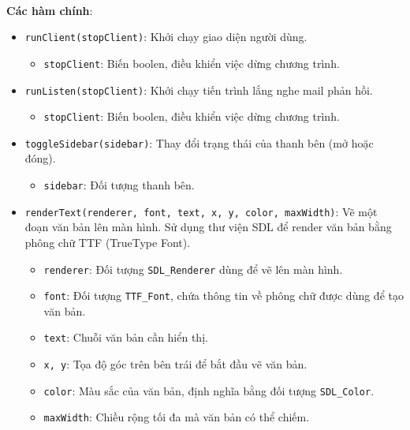 \begin{itemize}
\end{itemize}


\paragraph{}{\textbf{Các hàm chính}:}
\begin{itemize}
    \item \texttt{runClient(stopClient)}: Khởi chạy giao diện người dùng.
    \begin{itemize}
        \item \texttt{stopClient}: Biến boolen, điều khiển việc dừng chương trình.
    \end{itemize}
    \item \texttt{runListen(stopClient)}: Khởi chạy tiến trình lắng nghe mail phản hồi.
    \begin{itemize}
        \item \texttt{stopClient}: Biến boolen, điều khiển việc dừng chương trình.
    \end{itemize}

    \item \texttt{toggleSidebar(sidebar)}: Thay đổi trạng thái của thanh bên (mở hoặc đóng).
    \begin{itemize}
        \item \texttt{sidebar}: Đối tượng thanh bên.
    \end{itemize}
    
    \item \texttt{renderText(renderer, font, text, x, y, color, maxWidth)}: Vẽ một đoạn văn bản lên màn hình. Sử dụng thư viện SDL để render văn bản bằng phông chữ TTF (TrueType Font).
    \begin{itemize}
        \item \texttt{renderer}: Đối tượng \texttt{SDL\_Renderer} dùng để vẽ lên màn hình.
        \item \texttt{font}: Đối tượng \texttt{TTF\_Font}, chứa thông tin về phông chữ được dùng để tạo văn bản.
        \item \texttt{text}: Chuỗi văn bản cần hiển thị.
        \item \texttt{x, y}: Tọa độ góc trên bên trái để bắt đầu vẽ văn bản.
        \item \texttt{color}: Màu sắc của văn bản, định nghĩa bằng đối tượng \texttt{SDL\_Color}.
        \item \texttt{maxWidth}: Chiều rộng tối đa mà văn bản có thể chiếm.
    \end{itemize}


\end{itemize}
